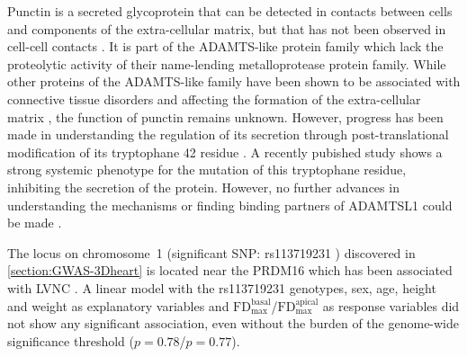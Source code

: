 %
Punctin is a secreted glycoprotein that can be detected in contacts between cells and components of the extra-cellular matrix, but that has not been observed in cell-cell contacts \citep{Hirohata2002}. It is part of the ADAMTS-like protein family which lack the proteolytic activity of their name-lending metalloprotease protein family. While other proteins of the ADAMTS-like family have been shown to be associated with connective tissue disorders and affecting the formation of the extra-cellular matrix \citep{Ahram2009,Hubmacher2015}, the function of punctin remains unknown. However, progress has been made in understanding the regulation of its secretion through post-translational modification of its tryptophane \num{42} residue \citep{Wang2009}. A recently pubished study shows a strong systemic phenotype for the mutation of this tryptophane residue, inhibiting the secretion of the protein. However, no further advances in understanding the mechanisms or finding binding partners of ADAMTSL1 could be made \citep{Hendee2017}.

The locus on chromosome~1 (significant SNP: rs113719231 ) discovered in \cref{section:GWAS-3Dheart} is located near the PRDM16 which has been associated with LVNC \citep{Arndt2013}. A linear model with the rs113719231 genotypes, sex, age, height and weight as explanatory variables and \(\text{FD}_\text{max}^\text{basal}\)/\(\text{FD}_\text{max}^\text{apical}\) as response variables did not show any significant association, even without the burden of the genome-wide significance threshold (\(p = 0.78\)/\(p = 0.77\)).

